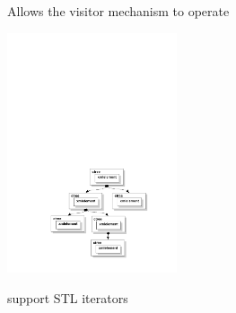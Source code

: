\documentclass{paper}
\begin{document}
\begin{frame}
\begin{columns}
\begin{column}[c]{5cm}
\begin{overlayarea}{\textwidth}{50mm}
{		  {\vspace{22mm} \begin{block}{}
		 		Allows the visitor mechanism to operate
				\end{block}}
			 {\vspace{12mm} \includegraphics[width=50mm]{imgs/ctree.pdf}}
		 	\only<8> {\vspace{32mm} \begin{block}{}
		 		support STL iterators
				\end{block}}
		}
		\end{overlayarea}
		\end{column}
	\end{columns}
\end{frame}

\end{document}
